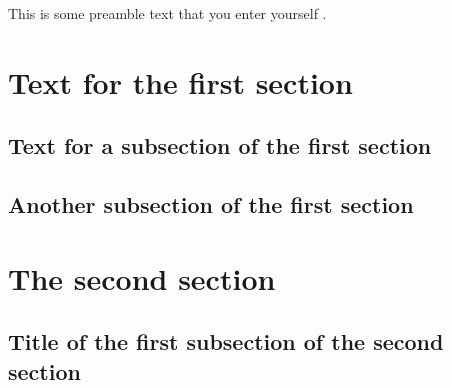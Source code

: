 \documentclass{article}
\begin{document}
This is some preamble text that you enter yourself .
%
\section { Text for the first section }
\lipsum [1]
\subsection { Text for a subsection of the first section }
\lipsum [2 -3]
\subsection { Another subsection of the first section }
\lipsum [4 -5]
\section { The second section }
\lipsum [6]
\subsection { Title of the first subsection of the second section }
\lipsum [7]
\end{document}
